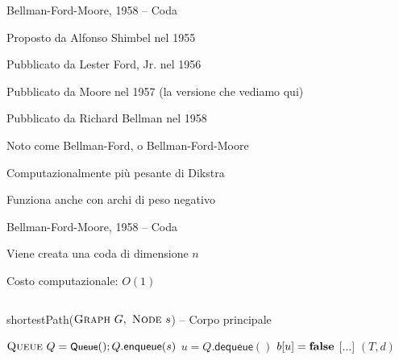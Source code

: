 \begin{frame}{Bellman-Ford-Moore, 1958 -- Coda}

\vspace{-9pt}
\begin{myboxtitle}[Storia]
\BI
\item Proposto da Alfonso Shimbel nel 1955
\item Pubblicato da Lester Ford, Jr. nel 1956
\item Pubblicato da Moore nel 1957 (la versione che vediamo qui)
\item Pubblicato da Richard Bellman nel 1958
\item Noto come Bellman-Ford, o Bellman-Ford-Moore
\EI
\end{myboxtitle}

\begin{myboxtitle}[Note]
\BI
\item Computazionalmente più pesante di Dikstra
\item Funziona anche con archi di peso negativo
\EI
\end{myboxtitle}

\end{frame}


\begin{frame}{Bellman-Ford-Moore, 1958 -- Coda}

\vspace{-9pt}
\begin{myboxtitle}
\BI
\item Viene creata una coda di dimensione $n$
\item Costo computazionale: $O(1)$
\EI
\end{myboxtitle}

\vspace{-18pt}
\begin{columns}
\small
\begin{Procedure}
\caption[A]{\textsf{shortestPath}($\textsc{Graph}\ G,\ \textsc{Node}\ s$) -- Corpo principale}
\alert{$\textsc{Queue}\ Q = \textsf{{\small Queue}}(); Q.\textsf{enqueue}(s)$}\;
{
  $u = Q.\textsf{dequeue}()$\;
  $b[u] = \FALSE$\;
  {
    {
      [...]
    }
  }
}
\Return $(T,d)$
\end{Procedure}
\end{columns}

\end{frame}


